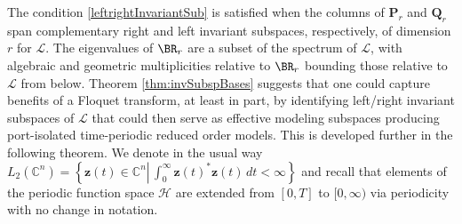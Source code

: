 \documentclass[pdflatex,sn-mathphys-num]{sn-jnl}%
\theoremstyle{thmstyleone}%
\theoremstyle{thmstyletwo}%
\theoremstyle{thmstylethree}%
\begin{document}
The condition \eqref{leftrightInvariantSub} is satisfied when the columns of $\mathbf{P}_r$ and $\mathbf{Q}_r$ span complementary right and left invariant subspaces, respectively, of dimension $r$ for $\mathscr{L}$. The eigenvalues of $\BR_r$ are a subset of the spectrum of $\mathscr{L}$, with algebraic and geometric multiplicities relative to $\BR_r$ bounding those relative to $\mathscr{L}$ from below. Theorem \ref{thm:invSubspBases} suggests that one could capture  benefits of a Floquet transform, at least in part, by identifying left/right invariant subspaces of $\mathscr{L}$ that could then serve as effective modeling subspaces producing port-isolated time-periodic reduced order models. This is developed further in the following theorem. We denote in the usual way $L_2(\mathbb{C}^n)=\left\{  \mathbf{z}(t)\in\mathbb{C}^n\left|\, \int_0^{\infty}\mathbf{z}(t)^*\mathbf{z}(t)\,dt<\infty\right.\right\}$ and recall that elements of the periodic function space $\mathscr{H}$ are extended from $[0,T]$ to $[0,\infty)$ via periodicity with no change in notation.  
\end{document}
